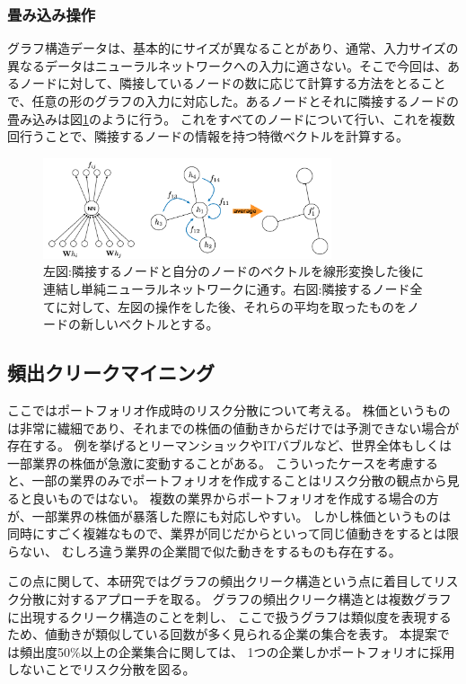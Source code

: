 \documentclass[twocolumn,10.5pt]{article}           %
\begin{document}
\subsubsection{畳み込み操作}
グラフ構造データは、基本的にサイズが異なることがあり、通常、入力サイズの異なるデータはニューラルネットワークへの入力に適さない。そこで今回は、あるノードに対して、隣接しているノードの数に応じて計算する方法をとることで、任意の形のグラフの入力に対応した。あるノードとそれに隣接するノードの畳み込みは図\ref{conv}のように行う。
これをすべてのノードについて行い、これを複数回行うことで、隣接するノードの情報を持つ特徴ベクトルを計算する。
\begin{figure}[htbp]
	\centering
	\includegraphics[width=85mm]{img/img02.png}
	\caption{左図:隣接するノードと自分のノードのベクトルを線形変換した後に連結し単純ニューラルネットワークに通す。右図:隣接するノード全てに対して、左図の操作をした後、それらの平均を取ったものをノードの新しいベクトルとする。}
	\label{conv}
\end{figure}
\subsection{頻出クリークマイニング}
ここではポートフォリオ作成時のリスク分散について考える。
株価というものは非常に繊細であり、それまでの株価の値動きからだけでは予測できない場合が存在する。
例を挙げるとリーマンショックやITバブルなど、世界全体もしくは一部業界の株価が急激に変動することがある。
こういったケースを考慮すると、一部の業界のみでポートフォリオを作成することはリスク分散の観点から見ると良いものではない。
複数の業界からポートフォリオを作成する場合の方が、一部業界の株価が暴落した際にも対応しやすい。
しかし株価というものは同時にすごく複雑なもので、業界が同じだからといって同じ値動きをするとは限らない、
むしろ違う業界の企業間で似た動きをするものも存在する。

この点に関して、本研究ではグラフの頻出クリーク構造という点に着目してリスク分散に対するアプローチを取る。
グラフの頻出クリーク構造とは複数グラフに出現するクリーク構造のことを刺し、
ここで扱うグラフは類似度を表現するため、値動きが類似している回数が多く見られる企業の集合を表す。
本提案では頻出度50\%以上の企業集合に関しては、
1つの企業しかポートフォリオに採用しないことでリスク分散を図る。
\end{document}
